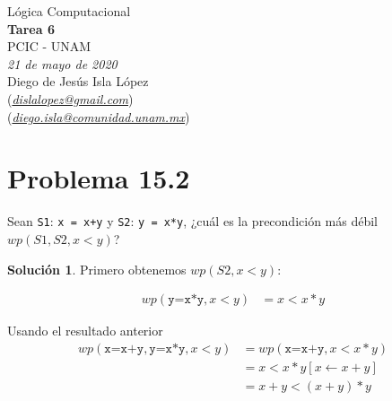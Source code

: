 \documentclass[letterpaper,12pt]{memoir}
\theoremstyle{definition}
\newtheorem{solution}{Solución}
\begin{document}
\begin{center}
  {\large Lógica Computacional}\\
  \vspace{0.2cm}
  {\large\bfseries Tarea 6}\\
  \vspace{0.2cm}
  {\large PCIC - UNAM}\\
  \vspace{0.5cm}
  {\itshape 21 de mayo de 2020}\\
  \vspace{0.5cm}
  Diego de Jesús Isla López\\
  (\href{mailto:dislalopez@gmail.com}{\itshape dislalopez@gmail.com})\\
  (\href{mailto:diego.isla@comunidad.unam.mx}{\itshape diego.isla@comunidad.unam.mx})\\
\end{center}


\section*{Problema 15.2}

Sean \verb|S1|: \verb|x = x+y| y  \verb|S2|: \verb|y = x*y|, ¿cuál es la precondición más débil \(wp(S1,S2,x<y)\)?

\begin{solution}

Primero obtenemos \(wp(S2, x<y)\):

\begin{align*}
wp(\texttt{y=x*y},x<y) &= x < x*y
\end{align*}

Usando el resultado anterior\\
	\begin{align*}
	wp(\texttt{x=x+y},\texttt{y=x*y},x<y)  &= wp(\texttt{x=x+y}, x<x*y)\\
										  &= x<x*y[x\leftarrow x+y]\\
										  &= x+y<(x+y)*y\\
	\end{align*}
\end{solution}
\end{document}
